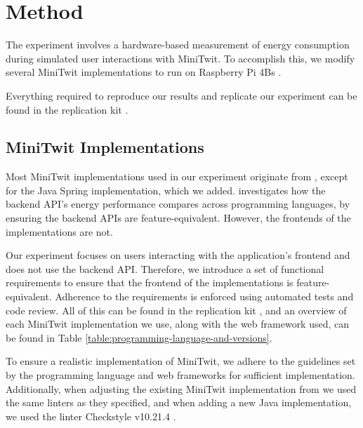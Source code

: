 \documentclass[main.tex]{subfiles}
\begin{document}
\section{Method}
\label{section:method}
The experiment involves a hardware-based measurement of energy consumption during simulated user interactions with MiniTwit. To accomplish this, we modify several MiniTwit implementations to run on Raspberry Pi 4Bs \cite{raspberrypi2025productbrief}.

Everything required to reproduce our results and replicate our experiment can be found in the replication kit \cite{replication-kit-Karlsen_Landsgaard_Offenberg_Pedersen_2025}.

\subsection{MiniTwit Implementations}
Most MiniTwit implementations used in our experiment originate from \textcite{Pfeiffer_Trindade_Meding_Harwick} , except for the Java Spring implementation, which we added. \textcite{Pfeiffer_Trindade_Meding_Harwick} investigates how the backend API's energy performance compares across programming languages, by ensuring the backend APIs are feature-equivalent. However, the frontends of the implementations are not.

Our experiment focuses on users interacting with the application's frontend and does not use the backend API. Therefore, we introduce a set of functional requirements to ensure that the frontend of the implementations is feature-equivalent. Adherence to the requirements is enforced using automated tests and code review. All of this can be found in the replication kit \cite{replication-kit-Karlsen_Landsgaard_Offenberg_Pedersen_2025}, and an overview of each MiniTwit implementation we use, along with the web framework used, can be found in Table \ref{table:programming-language-and-versions}.

To ensure a realistic implementation of MiniTwit, we adhere to the guidelines set by the programming language and web frameworks for sufficient implementation. Additionally, when adjusting the existing MiniTwit implementation from \textcite{Pfeiffer_Trindade_Meding_Harwick} we used the same linters as they specified, and when adding a new Java implementation, we used the linter Checkstyle v10.21.4 \cite{checkstyleReleaseNotes}.
\end{document}
